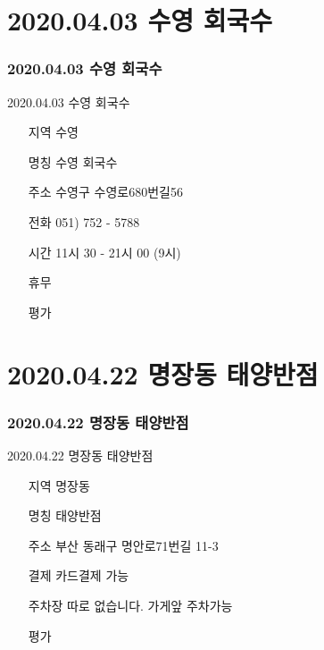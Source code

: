 \documentclass[aspectratio=1610,17pt,xcolor=pdftex,dvipsnames,table,handout]{beamer}
\begin{document}
		\section{ 2020.04.03 수영 회국수 }
		\begin{frame} [t,plain]
		\frametitle{ 2020.04.03 수영 회국수 }
			\begin{block} { 2020.04.03 수영 회국수 }
			\setlength{\leftmargini}{4em}			
			\begin{itemize}
				\item [지역] 수영 
				\item [명칭] 수영 회국수
				\item [주소] 수영구 수영로680번길56
				\item [전화] 051) 752 - 5788
				\item [시간] 11시 30 - 21시 00 (9시)
				\item [휴무] 
				\item [평가] 
			\end{itemize}
			\end{block}						
		\end{frame}						



		\section 	{2020.04.22 	명장동 태양반점}
		\begin{frame} [t,plain]
		\frametitle 			{2020.04.22 	명장동 태양반점}
			\begin{block} 	{2020.04.22 	명장동 태양반점}
			\setlength{\leftmargini}{4em}			
			\begin{itemize}
				\item [지역] 명장동
				\item [명칭] 태양반점
				\item [주소] 부산 동래구 명안로71번길 11-3
				\item [결제] 카드결제 가능
				\item [주차장] 따로 없습니다.  가게앞 주차가능
				\item [평가] 
			\end{itemize}
			\end{block}						
		\end{frame}						
\end{document}
